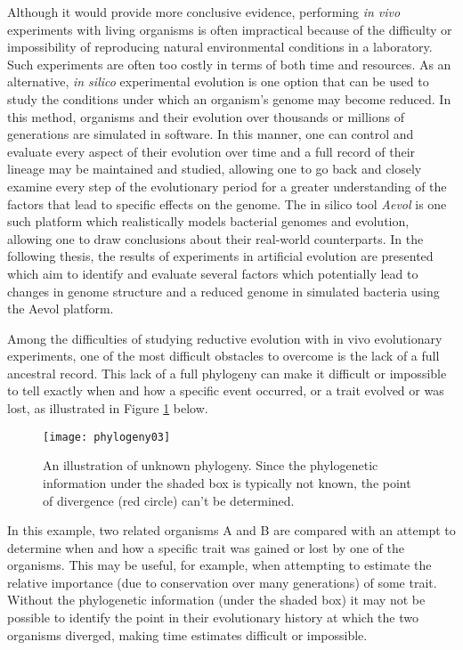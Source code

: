 Although it would provide more conclusive evidence, performing \textit{in vivo} experiments with living organisms is often impractical because of the difficulty or impossibility of reproducing natural environmental conditions in a laboratory. Such experiments are often too costly in terms of both time and resources. As an alternative, \textit{in silico} experimental evolution is one option that can be used to study the conditions under which an organism's genome may become reduced. In this method, organisms and their evolution over thousands or millions of generations are simulated in software. In this manner, one can control and evaluate every aspect of their evolution over time and a full record of their lineage may be maintained and studied, allowing one to go back and closely examine every step of the evolutionary period for a greater understanding of the factors that lead to specific effects on the genome. The in silico tool \textit{Aevol} is one such platform which realistically models bacterial genomes and evolution, allowing one to draw conclusions about their real-world counterparts. In the following thesis, the results of experiments in artificial evolution are presented which aim to identify and evaluate several factors which potentially lead to changes in genome structure and a reduced genome in simulated bacteria using the Aevol platform. 

Among the difficulties of studying reductive evolution with in vivo evolutionary experiments, one of the most difficult obstacles to overcome is the lack of a full ancestral record. This lack of a full phylogeny can make it difficult or impossible to tell exactly when and how a specific event occurred, or a trait evolved or was lost, as illustrated in Figure \ref{fig:phylogeny03} below. 
\begin{figure}[h]
\texttt{[image: phylogeny03]}
\centering
\caption[Unknown phylogeny]{An illustration of unknown phylogeny. Since the phylogenetic information under the shaded box is typically not known, the point of divergence (red circle) can't be determined.}
\label{fig:phylogeny03}
\end{figure}
In this example, two related organisms A and B are compared with an attempt to determine when and how a specific trait was gained or lost by one of the organisms. This may be useful, for example, when attempting to estimate the relative importance (due to conservation over many generations) of some trait. Without the phylogenetic information (under the shaded box) it may not be possible to identify the point in their evolutionary history at which the two organisms diverged, making time estimates difficult or impossible.

